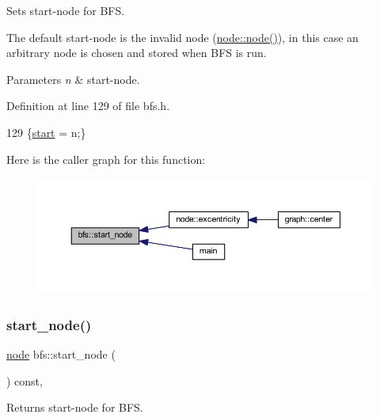 Sets start-\/node for B\+FS. 

The default start-\/node is the invalid node (\mbox{\hyperlink{classnode_a6da4ea35f222059db9a59cf40be459f9}{node\+::node()}}), in this case an arbitrary node is chosen and stored when B\+FS is run.


\begin{DoxyParams}{Parameters}
{\em n} & start-\/node. \\
\hline
\end{DoxyParams}


Definition at line 129 of file bfs.\+h.


\begin{DoxyCode}
129 \{\mbox{\hyperlink{classbfs_af2ab561d9e60a9fc2e25b02d1f807f96}{start}} = n;\}
\end{DoxyCode}
Here is the caller graph for this function\+:
\nopagebreak
\begin{figure}[H]
\begin{center}
\leavevmode
\includegraphics[width=350pt]{classbfs_a23e2981c2ee617a6e12a8833d2db6210_icgraph}
\end{center}
\end{figure}
\mbox{\label{classbfs_afac59b4a0d92449d8fa46a202b11ae4b}} 
\subsubsection{\texorpdfstring{start\+\_\+node()}{start\_node()}\hspace{0.1cm}{\footnotesize\ttfamily [2/2]}}
{\footnotesize\ttfamily \mbox{\hyperlink{classnode}{node}} bfs\+::start\+\_\+node (\begin{DoxyParamCaption}{ }\end{DoxyParamCaption}) const\hspace{0.3cm}{\ttfamily [inline]}, {\ttfamily [inherited]}}



Returns start-\/node for B\+FS. 

